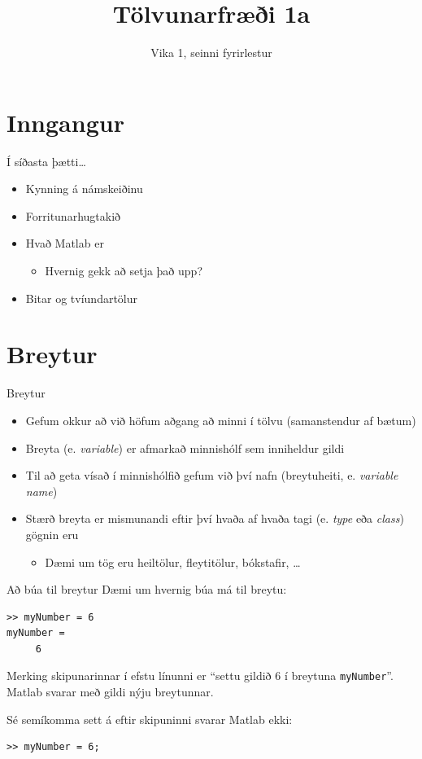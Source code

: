 \documentclass{beamer}
\title{Tölvunarfræði 1a}
\subtitle{Vika 1, seinni fyrirlestur}
\begin{document}
\begin{frame}
\titlepage
\end{frame}

\section{Inngangur}

\begin{frame}{Í síðasta þætti\ldots}
\begin{itemize}
 \item Kynning á námskeiðinu
 \item Forritunarhugtakið
 \item Hvað Matlab er
 \begin{itemize}
  \item Hvernig gekk að setja það upp?
 \end{itemize}
 \item Bitar og tvíundartölur
\end{itemize}
\end{frame}

\section{Breytur}

\begin{frame}{Breytur}
\begin{itemize}
 \item Gefum okkur að við höfum aðgang að minni í tölvu (samanstendur af bætum)
 \item Breyta (e. \emph{variable}) er afmarkað minnishólf sem inniheldur gildi
 \item Til að geta vísað í minnishólfið gefum við því nafn (breytuheiti, e. \emph{variable name})
 \item Stærð breyta er mismunandi eftir því hvaða af hvaða tagi (e. \emph{type} eða \emph{class}) gögnin eru
 \begin{itemize}
  \item Dæmi um tög eru heiltölur, fleytitölur, bókstafir, \ldots
 \end{itemize}
\end{itemize}
\end{frame}

\begin{frame}[fragile]{Að búa til breytur}
Dæmi um hvernig búa má til breytu:
\begin{verbatim}
>> myNumber = 6
myNumber =  
     6
\end{verbatim}
Merking skipunarinnar í efstu línunni er ``settu gildið $6$ í breytuna \texttt{myNumber}''. Matlab svarar með gildi nýju breytunnar.

Sé semíkomma sett á eftir skipuninni svarar Matlab ekki:
\begin{verbatim}
>> myNumber = 6;
\end{verbatim}
\end{frame}
\end{document}
